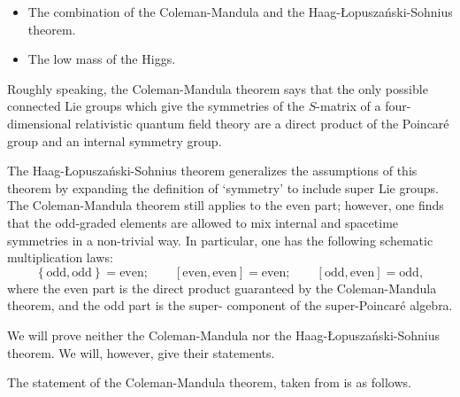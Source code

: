\documentclass[a4paper]{report}
\theoremstyle{definition}
\theoremstyle{plain}
\theoremstyle{remark}
\begin{document}
\begin{itemize}
  \item The combination of the Coleman-Mandula and the Haag-{\L}opusza{\'n}ski-Sohnius theorem.

  \item The low mass of the Higgs.
\end{itemize}

Roughly speaking, the Coleman-Mandula theorem says that the only possible connected Lie groups which give the symmetries of the $S$-matrix of a four-dimensional relativistic quantum field theory are a direct product of the Poincar{\'e} group and an internal symmetry group. 

The Haag-{\L}opusza{\'n}ski-Sohnius theorem generalizes the assumptions of this theorem by expanding the definition of `symmetry' to include super Lie groups. The Coleman-Mandula theorem still applies to the even part; however, one finds that the odd-graded elements are allowed to mix internal and spacetime symmetries in a non-trivial way. In particular, one has the following schematic multiplication laws:
\begin{equation*}
  \left\{ \text{odd}, \text{odd} \right\} = \text{even};\qquad \left[ \text{even}, \text{even} \right] = \text{even};\qquad \left[ \text{odd}, \text{even} \right] = \text{odd},
\end{equation*}
where the even part is the direct product guaranteed by the Coleman-Mandula theorem, and the odd part is the super- component of the super-Poincar{\'e} algebra.

We will prove neither the Coleman-Mandula nor the Haag-{\L}opusza{\'n}ski-Sohnius theorem. We will, however, give their statements.

The statement of the Coleman-Mandula theorem, taken from \cite{muller-kirsen-wiedmann-intro-susy} is as follows.
\end{document}
